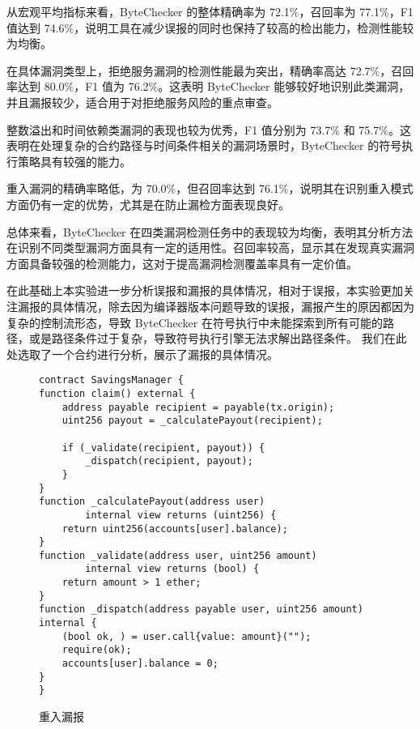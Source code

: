 \documentclass[print, master, vlined, timesmath]{DissertUESTC}
\begin{document}
从宏观平均指标来看，ByteChecker 的整体精确率为 72.1\%，召回率为 77.1\%，F1 值达到 74.6\%，说明工具在减少误报的同时也保持了较高的检出能力，检测性能较为均衡。

在具体漏洞类型上，拒绝服务漏洞的检测性能最为突出，精确率高达 72.7\%，召回率达到 80.0\%，F1 值为 76.2\%。这表明 ByteChecker 能够较好地识别此类漏洞，并且漏报较少，适合用于对拒绝服务风险的重点审查。

整数溢出和时间依赖类漏洞的表现也较为优秀，F1 值分别为 73.7\% 和 75.7\%。这表明在处理复杂的合约路径与时间条件相关的漏洞场景时，ByteChecker 的符号执行策略具有较强的能力。

重入漏洞的精确率略低，为 70.0\%，但召回率达到 76.1\%，说明其在识别重入模式方面仍有一定的优势，尤其是在防止漏检方面表现良好。

总体来看，ByteChecker 在四类漏洞检测任务中的表现较为均衡，表明其分析方法在识别不同类型漏洞方面具有一定的适用性。召回率较高，显示其在发现真实漏洞方面具备较强的检测能力，这对于提高漏洞检测覆盖率具有一定价值。

在此基础上本实验进一步分析误报和漏报的具体情况，相对于误报，本实验更加关注漏报的具体情况，除去因为编译器版本问题导致的误报，漏报产生的原因都因为复杂的控制流形态，导致 ByteChecker 在符号执行中未能探索到所有可能的路径，或是路径条件过于复杂，导致符号执行引擎无法求解出路径条件。 我们在此处选取了一个合约进行分析，展示了漏报的具体情况。

\begin{figure}[H]
    \centering
    \begin{minipage}{0.9\textwidth}
    \begin{verbatim}
contract SavingsManager {
function claim() external {
    address payable recipient = payable(tx.origin);
    uint256 payout = _calculatePayout(recipient);

    if (_validate(recipient, payout)) {
        _dispatch(recipient, payout);
    }
}
function _calculatePayout(address user) 
        internal view returns (uint256) {
    return uint256(accounts[user].balance);
}
function _validate(address user, uint256 amount) 
        internal view returns (bool) {
    return amount > 1 ether; 
}
function _dispatch(address payable user, uint256 amount) internal {
    (bool ok, ) = user.call{value: amount}("");
    require(ok);
    accounts[user].balance = 0;
}
}
    \end{verbatim}
    \end{minipage}
    \caption{重入漏报}
    \label{fig:reentrancy_miss}
\end{figure}
\end{document}
